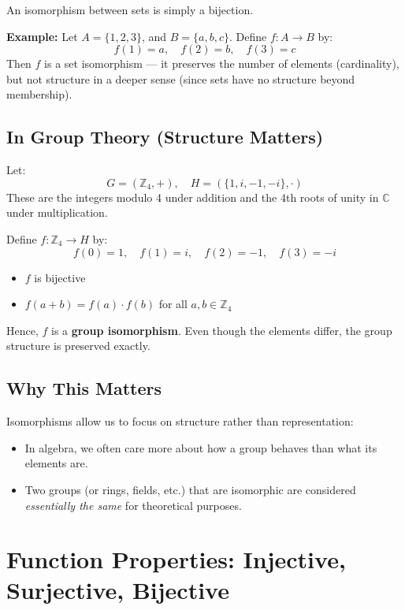 \documentclass[10pt]{article}
\theoremstyle{plain}
\theoremstyle{definition}
\begin{document}
	An isomorphism between sets is simply a bijection.
	
	\textbf{Example:}  
	Let \( A = \{1, 2, 3\} \), and \( B = \{a, b, c\} \).  
	Define \( f : A \to B \) by:
	\[
	f(1) = a, \quad f(2) = b, \quad f(3) = c
	\]
	Then \( f \) is a set isomorphism — it preserves the number of elements (cardinality), but not structure in a deeper sense (since sets have no structure beyond membership).
	
	\subsection*{In Group Theory (Structure Matters)}
	
	Let:
	\[
	G = (\mathbb{Z}_4, +), \quad H = (\{1, i, -1, -i\}, \cdot)
	\]
	These are the integers modulo 4 under addition and the 4th roots of unity in \( \mathbb{C} \) under multiplication.
	
	Define \( f : \mathbb{Z}_4 \to H \) by:
	\[
	f(0) = 1, \quad f(1) = i, \quad f(2) = -1, \quad f(3) = -i
	\]
	
	\begin{itemize}
		\item \( f \) is bijective
		\item \( f(a + b) = f(a) \cdot f(b) \) for all \( a, b \in \mathbb{Z}_4 \)
	\end{itemize}
	
	Hence, \( f \) is a \textbf{group isomorphism}. Even though the elements differ, the group structure is preserved exactly.
	
	\subsection*{Why This Matters}
	
	Isomorphisms allow us to focus on structure rather than representation:
	\begin{itemize}
		\item In algebra, we often care more about how a group behaves than what its elements are.
		\item Two groups (or rings, fields, etc.) that are isomorphic are considered \textit{essentially the same} for theoretical purposes.
	\end{itemize}
	
	
	\section*{Function Properties: Injective, Surjective, Bijective}
	
\end{document}
